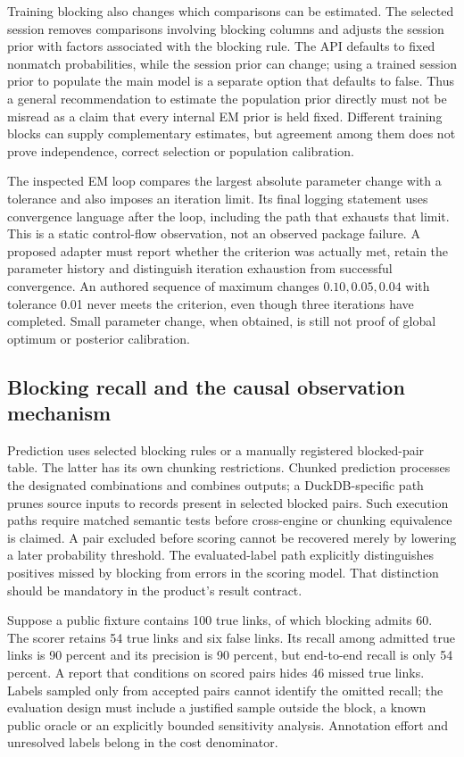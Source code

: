 Training blocking also changes which comparisons can be estimated. The selected session removes comparisons involving blocking columns and adjusts the session prior with factors associated with the blocking rule. The API defaults to fixed nonmatch probabilities, while the session prior can change; using a trained session prior to populate the main model is a separate option that defaults to false. Thus a general recommendation to estimate the population prior directly must not be misread as a claim that every internal EM prior is held fixed. Different training blocks can supply complementary estimates, but agreement among them does not prove independence, correct selection or population calibration.~\citep{exec24_splink_sources}

The inspected EM loop compares the largest absolute parameter change with a tolerance and also imposes an iteration limit. Its final logging statement uses convergence language after the loop, including the path that exhausts that limit. This is a static control-flow observation, not an observed package failure. A proposed adapter must report whether the criterion was actually met, retain the parameter history and distinguish iteration exhaustion from successful convergence. An authored sequence of maximum changes $0.10,0.05,0.04$ with tolerance 0.01 never meets the criterion, even though three iterations have completed. Small parameter change, when obtained, is still not proof of global optimum or posterior calibration.~\citep{exec24_splink_sources,exec24_splink_contract}

\subsection{Blocking recall and the causal observation mechanism}
Prediction uses selected blocking rules or a manually registered blocked-pair table. The latter has its own chunking restrictions. Chunked prediction processes the designated combinations and combines outputs; a DuckDB-specific path prunes source inputs to records present in selected blocked pairs. Such execution paths require matched semantic tests before cross-engine or chunking equivalence is claimed. A pair excluded before scoring cannot be recovered merely by lowering a later probability threshold. The evaluated-label path explicitly distinguishes positives missed by blocking from errors in the scoring model. That distinction should be mandatory in the product's result contract.~\citep{exec24_splink_sources}

Suppose a public fixture contains 100 true links, of which blocking admits 60. The scorer retains 54 true links and six false links. Its recall among admitted true links is 90 percent and its precision is 90 percent, but end-to-end recall is only 54 percent. A report that conditions on scored pairs hides 46 missed true links. Labels sampled only from accepted pairs cannot identify the omitted recall; the evaluation design must include a justified sample outside the block, a known public oracle or an explicitly bounded sensitivity analysis. Annotation effort and unresolved labels belong in the cost denominator.~\citep{exec24_splink_contract}

